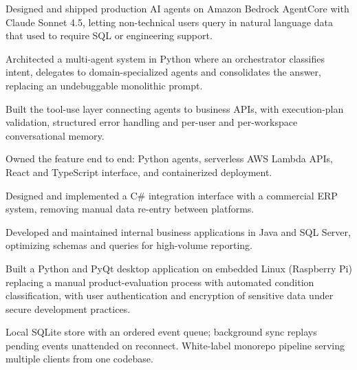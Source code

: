\documentclass{atscv}
\begin{document}
\begin{cvbullets}
  \item Designed and shipped production AI agents on Amazon Bedrock AgentCore
        with Claude Sonnet 4.5, letting non-technical users query in natural
        language data that used to require SQL or engineering support.
  \item Architected a multi-agent system in Python where an orchestrator
        classifies intent, delegates to domain-specialized agents and
        consolidates the answer, replacing an undebuggable monolithic prompt.
  \item Built the tool-use layer connecting agents to business APIs, with
        execution-plan validation, structured error handling and per-user and
        per-workspace conversational memory.
  \item Owned the feature end to end: Python agents, serverless AWS Lambda APIs,
        React and TypeScript interface, and containerized deployment.
\end{cvbullets}

\begin{cvbullets}
  \item Designed and implemented a C\# integration interface with a commercial
        ERP system, removing manual data re-entry between platforms.%
  \item Developed and maintained internal business applications in Java and SQL
        Server, optimizing schemas and queries for high-volume reporting.
\end{cvbullets}

\begin{cvbullets}
  \item Built a Python and PyQt desktop application on embedded Linux
        (Raspberry Pi) replacing a manual product-evaluation process with
        automated condition classification, with user authentication and
        encryption of sensitive data under secure development practices.
\end{cvbullets}


\begin{cvbullets}
  \item Local SQLite store with an ordered event queue; background sync replays
        pending events unattended on reconnect. White-label monorepo pipeline
        serving multiple clients from one codebase.
\end{cvbullets}
\end{document}
